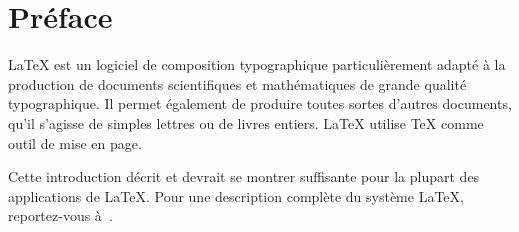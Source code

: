 



\chapter{Préface}
\thispagestyle{plain}

\LaTeX{} \cite{manual} est un logiciel de composition typographique
particulièrement adapté à la production de documents scientifiques et mathématiques de
grande qualité typographique. Il permet également de produire
toutes sortes d'autres documents, qu'il s'agisse de simples lettres ou
de livres entiers. \LaTeX{} utilise \TeX{} \cite{texbook} comme outil de
mise en page. 

Cette introduction décrit \LaTeXe{} et devrait se montrer suffisante
pour la plupart des applications de \LaTeX. Pour une description
complète du système \LaTeX{}, reportez-vous
à~\cite{manual,companion}. 

